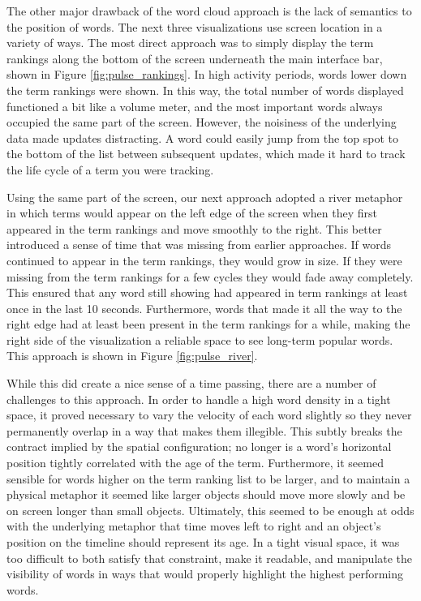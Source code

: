 The other major drawback of the word cloud approach is the lack of semantics to the position of words. The next three visualizations use screen location in a variety of ways. The most direct approach was to simply display the term rankings along the bottom of the screen underneath the main interface bar, shown in Figure \ref{fig:pulse_rankings}. In high activity periods, words lower down the term rankings were shown. In this way, the total number of words displayed functioned a bit like a volume meter, and the most important words always occupied the same part of the screen. However, the noisiness of the underlying data made updates distracting. A word could easily jump from the top spot to the bottom of the list between subsequent updates, which made it hard to track the life cycle of a term you were tracking. 

Using the same part of the screen, our next approach adopted a river metaphor in which terms would appear on the left edge of the screen when they first appeared in the term rankings and move smoothly to the right. This better introduced a sense of time that was missing from earlier approaches. If words continued to appear in the term rankings, they would grow in size. If they were missing from the term rankings for a few cycles they would fade away completely. This ensured that any word still showing had appeared in term rankings at least once in the last 10 seconds. Furthermore, words that made it all the way to the right edge had at least been present in the term rankings for a while, making the right side of the visualization a reliable space to see long-term popular words. This approach is shown in Figure \ref{fig:pulse_river}.

While this did create a nice sense of a time passing, there are a number of challenges to this approach. In order to handle a high word density in a tight space, it proved necessary to vary the velocity of each word slightly so they never permanently overlap in a way that makes them illegible. This subtly breaks the contract implied by the spatial configuration; no longer is a word's horizontal position tightly correlated with the age of the term. Furthermore, it seemed sensible for words higher on the term ranking list to be larger, and to maintain a physical metaphor it seemed like larger objects should move more slowly and be on screen longer than small objects. Ultimately, this seemed to be enough at odds with the underlying metaphor that time moves left to right and an object's position on the timeline should represent its age. In a tight visual space, it was too difficult to both satisfy that constraint, make it readable, and manipulate the visibility of words in ways that would properly highlight the highest performing words.

